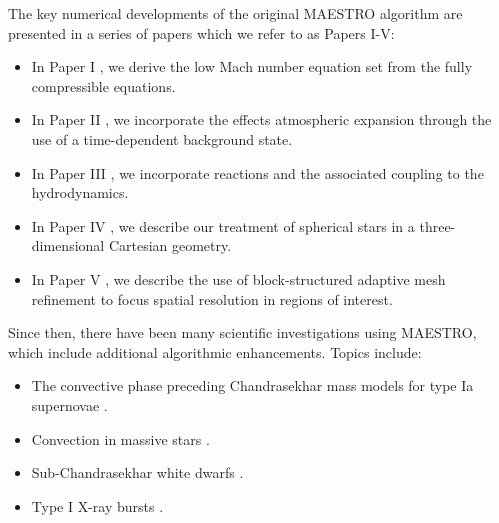 The key numerical developments of the original MAESTRO algorithm are presented in a series of papers which we refer to as Papers I-V:
\begin{itemize}
\item In Paper I \citep{MAESTRO_I}, we derive the low Mach number equation set from the fully compressible equations.
\item In Paper II \citep{MAESTRO_II}, we incorporate the effects atmospheric expansion through the use of a time-dependent background state.
\item In Paper III \citep{MAESTRO_III}, we incorporate reactions and the associated coupling to the hydrodynamics.
\item In Paper IV \citep{MAESTRO_IV}, we describe our treatment of spherical stars in a three-dimensional Cartesian geometry.
\item In Paper V \citep{MAESTRO_V}, we describe the use of block-structured adaptive mesh refinement to focus spatial resolution in regions of interest.
\end{itemize}

Since then, there have been many scientific investigations using MAESTRO, which include additional algorithmic enhancements.  Topics include:
\begin{itemize}
\item The convective phase preceding Chandrasekhar mass models for type Ia supernovae \citep{MAESTRO_convection,MAESTRO_AMR,MAESTRO_CASTRO}.
\item Convection in massive stars \citep{Gilet:2013}.
\item Sub-Chandrasekhar white dwarfs \citep{subChandra_I,subChandra_II}.
\item Type I X-ray bursts \citep{XRB_I,XRB_II,XRB_III}.
\end{itemize}

